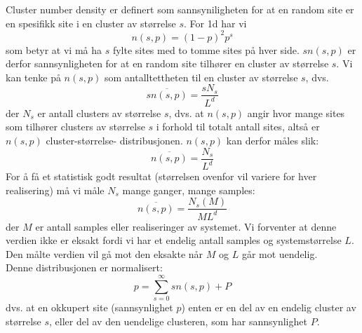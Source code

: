 \documentclass[english, a4paper]{article}
\begin{document}
\noindent
Cluster number density er definert som sannsyniligheten for at en random site er en spesifikk site
i en cluster av størrelse $s$. For 1d har vi
\begin{equation}
 n(s,p) = (1-p)^2 p^s
\end{equation}
som betyr at vi må ha $s$ fylte sites med to tomme sites på hver side. $sn(s,p)$ er derfor sannsynligheten
for at en random site tilhører en cluster av størrelse $s$. Vi kan tenke på $n(s,p)$ som antalltettheten
til en cluster av størrelse $s$, dvs.
\begin{equation}
 \overline{sn(s,p)} = \frac{sN_s}{L^d}
\end{equation}
der $N_s$ er antall clusters av størrelse $s$, dvs. at $n(s,p)$ angir hvor mange sites som tilhører
clusters av størrelse $s$ i forhold til totalt antall sites, altså er $n(s,p)$ cluster-størrelse-
distribusjonen. 
$n(s,p)$ kan derfor måles slik:
\begin{equation}
 \overline{n(s,p)} = \frac{N_s}{L^d}
\end{equation}
For å få et statistisk godt resultat (størrelsen ovenfor vil variere for hver realisering)
må vi måle $N_s$ mange ganger, mange samples:
\begin{equation}
 \overline{n(s,p)} = \frac{N_s(M)}{ML^d}
 \label{measureNsp}
\end{equation}
der $M$ er antall samples eller realiseringer av systemet. 
Vi forventer at denne verdien ikke er eksakt fordi vi har et endelig antall samples og systemstørrelse $L$.
Den målte verdien vil gå mot den eksakte når $M$ og $L$ går mot uendelig. \\

\noindent
Denne distribusjonen er normalisert:
\begin{equation}
 p = \sum_{s=0}^\infty sn(s,p) + P
\end{equation}
dvs. at en okkupert site (sannsynlighet $p$) enten er en del av en endelig cluster av størrelse $s$, eller
del av den uendelige clusteren, som har sannsynlighet $P$. \\
\end{document}
